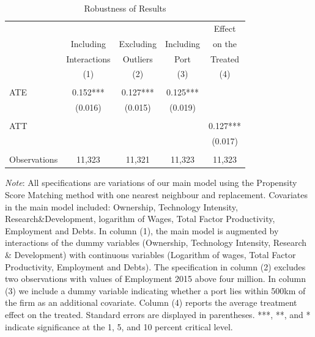 \documentclass[a4paper,11pt]{scrartcl}
\begin{document}
\begin{table}[h]
  \centering
   \caption{Robustness of Results}
   \label{tab:robust}
\begin{threeparttable}
 
\begin{tabular}{lcccc} 
	\hline 
	\hline
 		& & & & Effect \\
 		& Including & Excluding & Including & on the\\
 		& Interactions & Outliers 
 		& Port & Treated \\
 		& (1) & (2) & (3) & (4) \\ 
 	\hline
 		&  &  &  &  \\
ATE 	& 0.152*** & 0.127*** & 0.125*** &  \\
 		& (0.016) & (0.015) & (0.019) &  \\
 		&  &  &  &  \\
ATT 	&  &  &  & 0.127*** \\
 		&  &  &  & (0.017) \\
 		&  &  &  &  \\
Observations & 11,323 & 11,321 & 11,323 & 11,323 \\ 
	\hline
	\hline
\end{tabular}

\begin{tablenotes}[flushleft]
     \footnotesize  
    
\item \textit{Note}: All specifications are variations of our main model using the Propensity Score Matching method with one nearest neighbour and replacement. Covariates in the main model included: Ownership, Technology Intensity, Research\&Development, logarithm of Wages, Total Factor Productivity, Employment and Debts. In column (1), the main model is augmented by interactions of the dummy variables (Ownership, Technology Intensity, Research \& Development) with continuous variables (Logarithm of wages, Total Factor Productivity, Employment and Debts).  The specification in column (2) excludes two observations with values of Employment 2015 above four million. In column (3) we include a dummy variable indicating whether a port lies within 500km of the firm as an additional covariate. Column (4) reports the average treatment effect on the treated. Standard errors are displayed in parentheses. ***, **, and * indicate significance at the 1, 5, and 10 percent critical level. 

\end{tablenotes}

\end{threeparttable}
\end{table}
\end{document}
